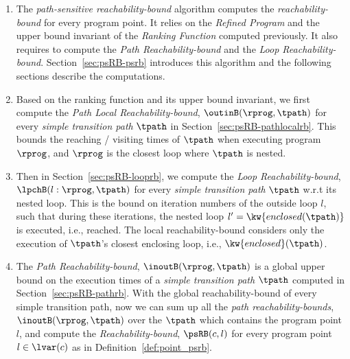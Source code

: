 \begin{enumerate}
\item The \emph{path-sensitive reachability-bound} algorithm computes the \emph{reachability-bound} for every program point.
It relies on the \emph{Refined Program} and the upper bound invariant of the \emph{Ranking Function} computed previously.
It also requires to compute the \emph{Path Reachability-bound} and the \emph{Loop Reachability-bound}.
Section~\ref{sec:psRB-psrb} introduces this algorithm and the following sections describe the computations. 
    \item Based on the ranking function and its upper bound invariant, we first compute the \emph{Path Local Reachability-bound}, $\outinB(\rprog, \tpath)$ for every \emph{simple transition path} $\tpath$ in Section~\ref{sec:psRB-pathlocalrb}. 
    This bounds the reaching / visiting times of $\tpath$ when executing program $\rprog$, and $\rprog$ is the closest loop where $\tpath$ is nested.
    \item Then in Section~\ref{sec:psRB-looprb}, we compute the \emph{Loop Reachability-bound}, $\lpchB(l: \rprog, \tpath)$ for every \emph{simple transition path} $\tpath$
    w.r.t its nested loop. 
    This is the bound on iteration numbers of the outside loop $l$,
    such that during these iterations, the nested loop $l' = \kw{enclosed(\tpath)}$ is executed, i.e., reached.
    The local reachability-bound  considers only the execution of $\tpath$'s closest enclosing loop, i.e., $\kw{enclosed}(\tpath)$.
    \item The \emph{Path Reachability-bound}, $\inoutB(\rprog, \tpath)$  is a global upper bound on the execution times of a \emph{simple transition path} $\tpath$ computed in Section~\ref{sec:psRB-pathrb}.
    With the global reachability-bound of every simple transition path, now we can sum up all the \emph{path reachability-bounds}, $\inoutB(\rprog, \tpath)$ over the $\tpath$ which contains the program point $l$, and compute the \emph{Reachability-bound}, $\psRB(c, l)$ for every program point $l \in \lvar(c)$ as in Definition~\ref{def:point_psrb}.
\end{enumerate}